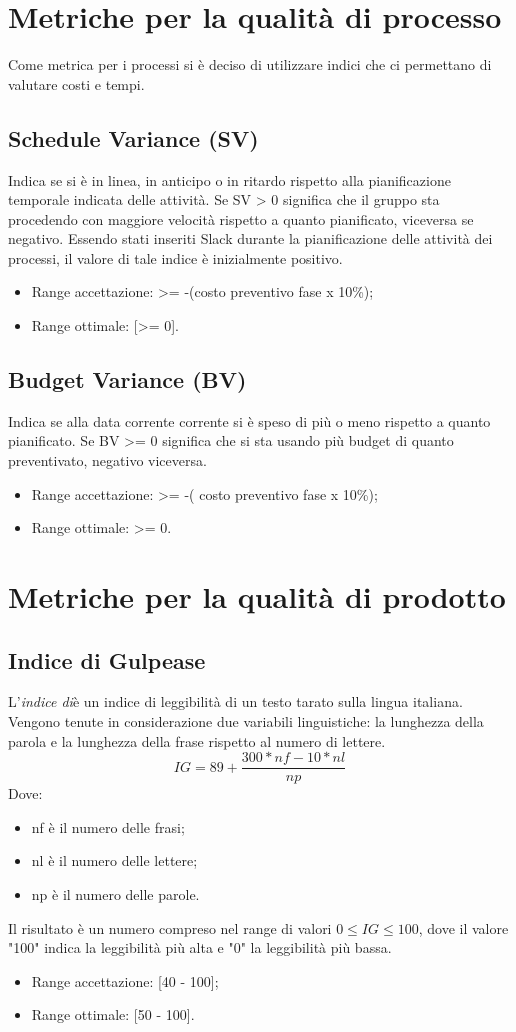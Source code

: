 \section{Metriche per la qualità di processo}\label{ProcessoMetriche}
Come metrica per i processi si è deciso di utilizzare indici che ci permettano di valutare costi e tempi. 
\subsection{Schedule Variance (SV)}
Indica se si è in linea, in anticipo o in ritardo rispetto alla pianificazione temporale indicata delle attività. 
Se SV > 0 significa che il gruppo sta procedendo con maggiore velocità rispetto a quanto pianificato, viceversa se negativo. 
Essendo stati inseriti Slack durante la pianificazione delle attività dei processi, il valore di tale indice è inizialmente positivo.
\begin{itemize}
	\item Range accettazione: >= -(costo preventivo fase x 10\%);
	\item Range ottimale: [>= 0]. 
\end{itemize}
\subsection{Budget Variance (BV)}
Indica se alla data corrente corrente si è speso di più o meno rispetto a quanto pianificato.
Se BV >= 0 significa che si sta usando più budget di quanto preventivato, negativo viceversa.
\begin{itemize}
	\item  Range accettazione: >= -( costo preventivo fase x 10\%);
	\item Range ottimale: >= 0.
\end{itemize}
\section{Metriche per la qualità di prodotto}
\subsection{Indice di Gulpease} \label{IndicediGulpease}
 L'\textit{indice di}è un indice di leggibilità di un testo tarato sulla lingua italiana. Vengono tenute in considerazione due variabili linguistiche:  la lunghezza della parola e la lunghezza della frase rispetto al numero di lettere.
\[ IG = 89+ \frac{300*nf - 10*nl}{np} \]
Dove:
\begin{itemize}
	\item nf è il numero delle frasi;
	\item nl è il numero delle lettere;
	\item np è il numero delle parole.
\end{itemize}
Il risultato è un numero compreso nel range di valori $0 \le{IG} \le{100}$, dove il valore "100" indica la leggibilità più alta e "0" la leggibilità più bassa.
\begin{itemize}
	\item Range accettazione: [40 - 100];
	\item Range ottimale: [50 - 100].
\end{itemize}
